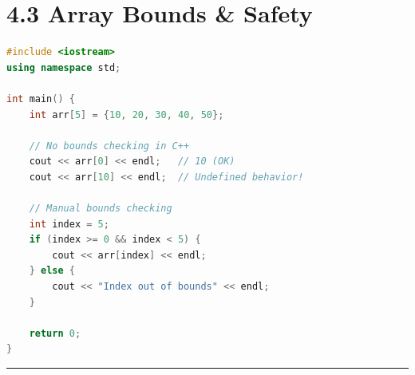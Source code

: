 \hypertarget{array-bounds-safety}{%
\section{4.3 Array Bounds \& Safety}\label{array-bounds-safety}}

\begin{lstlisting}[language={C++}]
#include <iostream>
using namespace std;

int main() {
    int arr[5] = {10, 20, 30, 40, 50};
    
    // No bounds checking in C++
    cout << arr[0] << endl;   // 10 (OK)
    cout << arr[10] << endl;  // Undefined behavior!
    
    // Manual bounds checking
    int index = 5;
    if (index >= 0 && index < 5) {
        cout << arr[index] << endl;
    } else {
        cout << "Index out of bounds" << endl;
    }
    
    return 0;
}
\end{lstlisting}

\begin{center}\rule{0.5\linewidth}{0.5pt}\end{center}
